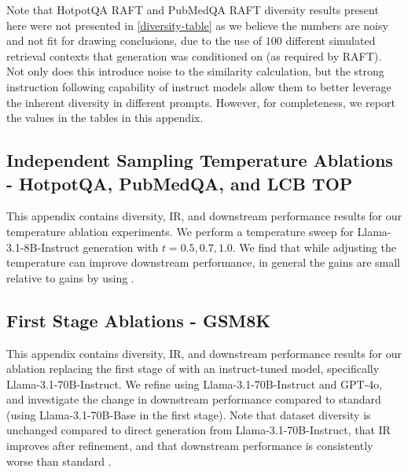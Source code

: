 Note that HotpotQA RAFT and PubMedQA RAFT diversity results present here were not presented in \cref{diversity-table} as we believe the numbers are noisy and not fit for drawing conclusions, due to the use of $100$ different simulated retrieval contexts that generation was conditioned on (as required by RAFT). Not only does this introduce noise to the similarity calculation, but the strong instruction following capability of instruct models allow them to better leverage the inherent diversity in different prompts. However, for completeness, we report the values in the tables in this appendix.








\subsection{Independent Sampling Temperature Ablations - HotpotQA, PubMedQA, and LCB TOP}
\label{appendix_temp}

This appendix contains diversity, IR, and downstream performance results for our temperature ablation experiments. We perform a temperature sweep for Llama-3.1-8B-Instruct generation with $t=0.5, 0.7, 1.0$. We find that while adjusting the temperature can improve downstream performance, in general the gains are small relative to gains by using \Sys{}.





\subsection{\Sys{} First Stage Ablations - GSM8K}
\label{appendix_refine}

This appendix contains diversity, IR, and downstream performance results for our ablation replacing the first stage of \Sys{} with an instruct-tuned model, specifically Llama-3.1-70B-Instruct. We refine using Llama-3.1-70B-Instruct and GPT-4o, and investigate the change in downstream performance compared to standard \Sys{} (using Llama-3.1-70B-Base in the first stage). Note that dataset diversity is unchanged compared to direct generation from Llama-3.1-70B-Instruct, that IR improves after refinement, and that downstream performance is consistently worse than standard \Sys{}.


